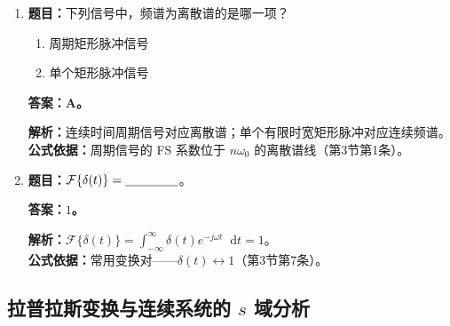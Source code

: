 \documentclass[12pt,a4paper]{ctexart}
\newcommand{\dif}{\mathop{}\!\mathrm{d}}
\begin{document}
\begin{enumerate}[label=\arabic*.]
\item \textbf{题目：}下列信号中，频谱为离散谱的是哪一项？
\begin{enumerate}[label=\Alph*.]
\item 周期矩形脉冲信号
\item 单个矩形脉冲信号
\end{enumerate}
\textbf{答案：A。}\par
\textbf{解析：}连续时间周期信号对应离散谱；单个有限时宽矩形脉冲对应连续频谱。\\
\textbf{公式依据：}周期信号的 FS 系数位于 $n\omega_0$ 的离散谱线（第3节第1条）。

\item \textbf{题目：}$\mathcal F\{\delta(t)\}=\underline{\hspace{1.5cm}}$。\par
\textbf{答案：$1$。}\par
\textbf{解析：}\(\displaystyle \mathcal F\{\delta(t)\}=\int_{-\infty}^{\infty}\delta(t)e^{-j\omega t}\dif t=1\)。\\
\textbf{公式依据：}常用变换对——$\delta(t)\longleftrightarrow1$（第3节第7条）。
\end{enumerate}

\subsection{拉普拉斯变换与连续系统的 $s$ 域分析}
\end{document}
